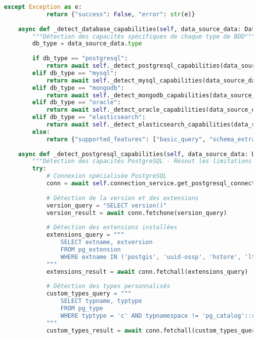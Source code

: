\begin{lstlisting}[language=Python, caption=Service DataSourceService - Résolution des Limitations Microsoft Purview]
        except Exception as e:
            return {"success": False, "error": str(e)}
    
    async def _detect_database_capabilities(self, data_source_data: DataSourceCreate) -> Dict[str, Any]:
        """Détection des capacités spécifiques de chaque type de BDD"""
        db_type = data_source_data.type
        
        if db_type == "postgresql":
            return await self._detect_postgresql_capabilities(data_source_data)
        elif db_type == "mysql":
            return await self._detect_mysql_capabilities(data_source_data)
        elif db_type == "mongodb":
            return await self._detect_mongodb_capabilities(data_source_data)
        elif db_type == "oracle":
            return await self._detect_oracle_capabilities(data_source_data)
        elif db_type == "elasticsearch":
            return await self._detect_elasticsearch_capabilities(data_source_data)
        else:
            return {"supported_features": ["basic_query", "schema_extraction"]}
    
    async def _detect_postgresql_capabilities(self, data_source_data: DataSourceCreate) -> Dict[str, Any]:
        """Détection des capacités PostgreSQL - Résout les limitations Purview"""
        try:
            # Connexion spécialisée PostgreSQL
            conn = await self.connection_service.get_postgresql_connection(data_source_data)
            
            # Détection de la version et des extensions
            version_query = "SELECT version()"
            version_result = await conn.fetchone(version_query)
            
            # Détection des extensions installées
            extensions_query = """
                SELECT extname, extversion 
                FROM pg_extension 
                WHERE extname IN ('postgis', 'uuid-ossp', 'hstore', 'ltree', 'pg_trgm')
            """
            extensions_result = await conn.fetchall(extensions_query)
            
            # Détection des types personnalisés
            custom_types_query = """
                SELECT typname, typtype 
                FROM pg_type 
                WHERE typtype = 'c' AND typnamespace != 'pg_catalog'::regnamespace
            """
            custom_types_result = await conn.fetchall(custom_types_query)
            

\end{lstlisting}
